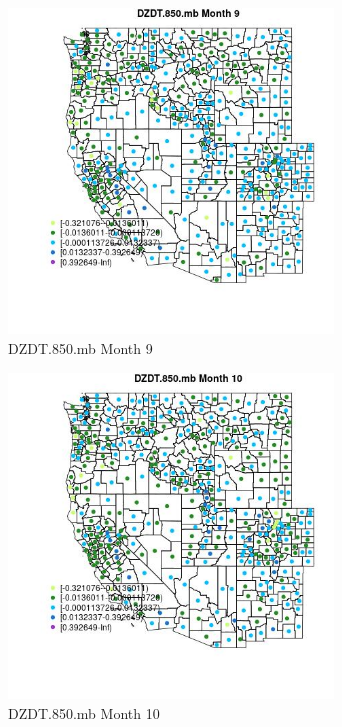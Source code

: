 \begin{figure} 
\centering  
\includegraphics[width=0.77\textwidth]{Code_Outputs/df_report_ML_predictors_CountyCentroid_Locations_Dates_2008-01-01to2018-12-31_MapObsMo9DZDT850mb.jpg} 
\caption{\label{fig:df_report_ML_predictors_CountyCentroid_Locations_Dates_2008-01-01to2018-12-31MapObsMo9DZDT850mb}DZDT.850.mb Month 9} 
\end{figure} 
 

\begin{figure} 
\centering  
\includegraphics[width=0.77\textwidth]{Code_Outputs/df_report_ML_predictors_CountyCentroid_Locations_Dates_2008-01-01to2018-12-31_MapObsMo10DZDT850mb.jpg} 
\caption{\label{fig:df_report_ML_predictors_CountyCentroid_Locations_Dates_2008-01-01to2018-12-31MapObsMo10DZDT850mb}DZDT.850.mb Month 10} 
\end{figure} 
 

